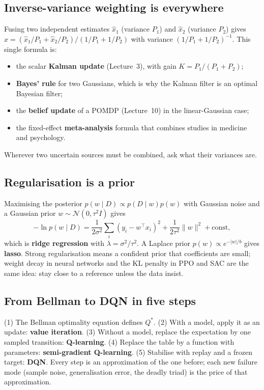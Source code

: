 \documentclass[11pt]{article}
\begin{document}
\subsection{Inverse-variance weighting is everywhere}
Fusing two independent estimates $\hat x_1$ (variance $P_1$) and $\hat x_2$ (variance $P_2$) gives $\hat x=(\hat x_1/P_1+\hat x_2/P_2)/(1/P_1+1/P_2)$ with variance $(1/P_1+1/P_2)^{-1}$. This single formula is:
\begin{itemize}
\item the scalar \textbf{Kalman update} (Lecture~3), with gain $K=P_1/(P_1+P_2)$;
\item \textbf{Bayes' rule} for two Gaussians, which is why the Kalman filter is an optimal Bayesian filter;
\item the \textbf{belief update} of a POMDP (Lecture~10) in the linear-Gaussian case;
\item the fixed-effect \textbf{meta-analysis} formula that combines studies in medicine and psychology.
\end{itemize}
Wherever two uncertain sources must be combined, ask what their variances are.

\subsection{Regularisation is a prior}
Maximising the posterior $p(w\mid D)\propto p(D\mid w)p(w)$ with Gaussian noise and a Gaussian prior $w\sim\mathcal N(0,\tau^2I)$ gives
\[-\ln p(w\mid D)=\frac1{2\sigma^2}\sum_i(y_i-w^\top x_i)^2+\frac1{2\tau^2}\|w\|^2+\text{const},\]
which is \textbf{ridge regression} with $\lambda=\sigma^2/\tau^2$. A Laplace prior $p(w)\propto e^{-|w|/b}$ gives \textbf{lasso}. Strong regularisation means a confident prior that coefficients are small; weight decay in neural networks and the KL penalty in PPO and SAC are the same idea: stay close to a reference unless the data insist.

\subsection{From Bellman to DQN in five steps}
(1) The Bellman optimality equation defines $Q^*$. (2) With a model, apply it as an update: \textbf{value iteration}. (3) Without a model, replace the expectation by one sampled transition: \textbf{Q-learning}. (4) Replace the table by a function with parameters: \textbf{semi-gradient Q-learning}. (5) Stabilise with replay and a frozen target: \textbf{DQN}. Every step is an approximation of the one before; each new failure mode (sample noise, generalisation error, the deadly triad) is the price of that approximation.
\end{document}
